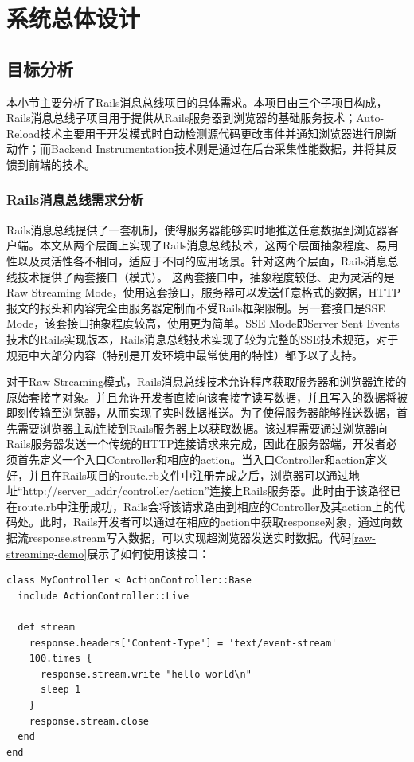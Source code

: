 \chapter{系统总体设计}
\section{目标分析}
本小节主要分析了Rails消息总线项目的具体需求。本项目由三个子项目构成，Rails消息总线子项目用于提供从Rails服务器到浏览器的基础服务技术；Auto-Reload技术主要用于开发模式时自动检测源代码更改事件并通知浏览器进行刷新动作；而Backend Instrumentation技术则是通过在后台采集性能数据，并将其反馈到前端的技术。

\subsection{Rails消息总线需求分析}
Rails消息总线提供了一套机制，使得服务器能够实时地推送任意数据到浏览器客户端。本文从两个层面上实现了Rails消息总线技术，这两个层面抽象程度、易用性以及灵活性各不相同，适应于不同的应用场景。针对这两个层面，Rails消息总线技术提供了两套接口（模式）。 这两套接口中，抽象程度较低、更为灵活的是Raw Streaming Mode，使用这套接口，服务器可以发送任意格式的数据，HTTP报文的报头和内容完全由服务器定制而不受Rails框架限制。另一套接口是SSE Mode，该套接口抽象程度较高，使用更为简单。SSE Mode即Server Sent Events技术的Rails实现版本，Rails消息总线技术实现了较为完整的SSE技术规范，对于规范中大部分内容（特别是开发环境中最常使用的特性）都予以了支持。

对于Raw Streaming模式，Rails消息总线技术允许程序获取服务器和浏览器连接的原始套接字对象。并且允许开发者直接向该套接字读写数据，并且写入的数据将被即刻传输至浏览器，从而实现了实时数据推送。为了使得服务器能够推送数据，首先需要浏览器主动连接到Rails服务器上以获取数据。该过程需要通过浏览器向Rails服务器发送一个传统的HTTP连接请求来完成，因此在服务器端，开发者必须首先定义一个入口Controller和相应的action。当入口Controller和action定义好，并且在Rails项目的route.rb文件中注册完成之后，浏览器可以通过地址“http://server\_addr/controller/action”连接上Rails服务器。此时由于该路径已在route.rb中注册成功，Rails会将该请求路由到相应的Controller及其action上的代码处。此时，Rails开发者可以通过在相应的action中获取response对象，通过向数据流response.stream写入数据，可以实现超浏览器发送实时数据。代码\ref{raw-streaming-demo}展示了如何使用该接口：

\begin{lstlisting}[caption={Raw Streaming Mode使用示例}, label=raw-streaming-demo]
class MyController < ActionController::Base
  include ActionController::Live

  def stream
    response.headers['Content-Type'] = 'text/event-stream'
    100.times {
      response.stream.write "hello world\n"
      sleep 1
    }
    response.stream.close
  end
end
\end{lstlisting}

